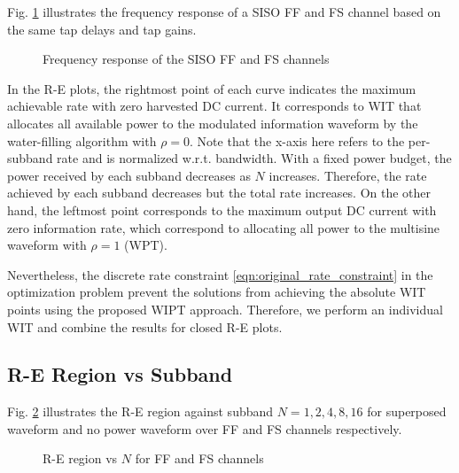 Fig. \ref{fig:siso-channels} illustrates the frequency response of a SISO FF and FS channel based on the same tap delays and tap gains.

\begin{figure}[ht]
  \centering
  \caption{Frequency response of the SISO FF and FS channels}\label{fig:siso-channels}
\end{figure}

In the R-E plots, the rightmost point of each curve indicates the maximum achievable rate with zero harvested DC current. It corresponds to WIT that allocates all available power to the modulated information waveform by the water-filling algorithm with $\rho  = 0$. Note that the x-axis here refers to the per-subband rate and is normalized w.r.t. bandwidth. With a fixed power budget, the power received by each subband decreases as $N$ increases. Therefore, the rate achieved by each subband decreases but the total rate increases. On the other hand, the leftmost point corresponds to the maximum output DC current with zero information rate, which correspond to allocating all power to the multisine waveform with $\rho  = 1$ (WPT).

Nevertheless, the discrete rate constraint \eqref{eqn:original_rate_constraint} in the optimization problem prevent the solutions from achieving the absolute WIT points using the proposed WIPT approach. Therefore, we perform an individual WIT and combine the results for closed R-E plots.

\subsection{R-E Region vs Subband}\label{sec:re-region-vs-subband}
Fig. \ref{fig:siso-subband} illustrates the R-E region against subband $N = 1,2,4,8,16$ for superposed waveform and no power waveform over FF and FS channels respectively.

\begin{figure}[ht]
  \centering
  \quad
  \caption{R-E region vs $N$ for FF and FS channels}\label{fig:siso-subband}
\end{figure}


